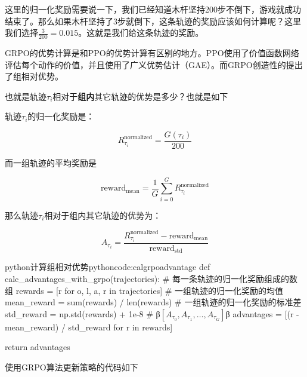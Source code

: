 \documentclass[lang=cn,newtx,10pt,scheme=chinese]{elegantbook}
\begin{document}
这里的归一化奖励需要说一下，我们已经知道木杆坚持200步不倒下，游戏就成功结束了。那么如果木杆坚持了3步就倒下，这条轨迹的奖励应该如何计算呢？这里我们选择$\frac{3}{200}=0.015$。这就是我们给这条轨迹的奖励。

GRPO的优势计算是和PPO的优势计算有区别的地方。PPO使用了价值函数网络评估每个动作的价值，并且使用了广义优势估计（GAE）。而GRPO创造性的提出了组相对优势。

也就是轨迹$\tau_i$相对于\textbf{组内}其它轨迹的优势是多少？也就是如下

轨迹$\tau_i$的归一化奖励是：

\begin{equation}
R_{\tau_{i}}^\text{normalized} = \frac{G(\tau_i)}{200}
\end{equation}

而一组轨迹的平均奖励是

\begin{equation}
\text{reward}_\text{mean} = \frac{1}{G}\sum_{i=0}^{G}R_{\tau_{i}}^\text{normalized}
\end{equation}

那么轨迹$\tau_i$相对于组内其它轨迹的优势为：

\begin{equation}
A_{\tau_i} = \frac{R_{\tau_{i}}^\text{normalized} - \text{reward}_\text{mean}}{\text{reward}_\text{std}}
\end{equation}

\begin{codebox}{python}{计算组相对优势}{pythoncode:calgrpoadvantage}
def calc_advantages_with_grpo(trajectories):
    # 每一条轨迹的归一化奖励组成的数组
    rewards = [r for o, l, a, r in trajectories]
    # 一组轨迹的归一化奖励的均值
    mean_reward = sum(rewards) / len(rewards)
    # 一组轨迹的归一化奖励的标准差
    std_reward = np.std(rewards)  + 1e-8
    # β$[A_{\tau_0},A_{\tau_1},\dots,A_{\tau_G}]$β
    advantages = [(r - mean_reward) / std_reward for r in rewards]  
    
    return advantages
\end{codebox}

使用GRPO算法更新策略的代码如下
\end{document}
